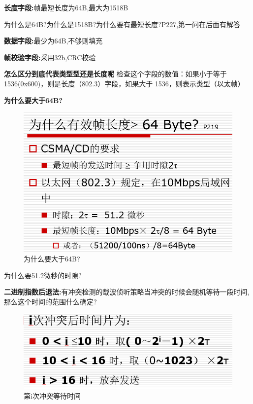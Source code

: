 \documentclass[UTF8,a4paper]{ctexart}
\newcommand{\spaceline}{\vspace{\baselineskip}}
\begin{document}
\spaceline
\textbf{长度字段:}帧最短长度为64B,最大为1518B

{\color{red}为什么是64B?为什么是1518B?为什么要有最短长度?P227,第一问在后面有解答}

\spaceline
\textbf{数据字段:}最少为64B,不够则填充

\spaceline
\textbf{帧校验字段:}采用32b,CRC校验

\textbf{怎么区分到底代表类型型还是长度呢}
检查这个字段的数值：如果小于等于 1536(0x600)，则是长度（802.3）字段，如果大于 1536，则表示类型（以太帧）

\textbf{为什么要大于64B?}
\begin{figure}[H]
  \centering
  \includegraphics[scale = 0.3]{assets/jisuanjiwangluo_02c3a.png}
  \caption{为什么要大于64B?}
\end{figure}

{\color{red}为什么要51.2微秒的时隙?}

\spaceline
\textbf{二进制指数后退法:}有冲突检测的载波侦听策略当冲突的时候会随机等待一段时间,那么这个时间的范围什么确定?\\
\begin{figure}[H]
  \centering
  \includegraphics[scale = 0.3]{assets/jisuanjiwangluo_d029d.png}
  \caption{第i次冲突等待时间}
\end{figure}
\end{document}
